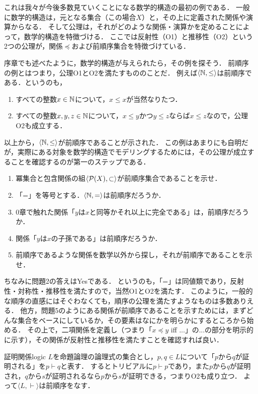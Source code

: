 \documentclass[dvipdfmx,11pt,a4paper]{jsarticle}
\begin{document}
これは我々が今後多数見ていくことになる数学的構造の最初の例である．
一般に数学的構造は，元となる集合（この場合$X$）と，その上に定義された関係や演算からなる．
そして公理は，それがどのような関係・演算かを定めることによって，数学的構造を特徴づける．
ここでは反射性（O1）と推移性（O2）という2つの公理が，関係$\preceq$および前順序集合を特徴づけている．

序章でも述べたように，数学的構造が与えられたら，その例を探そう．
前順序の例とはつまり，公理O1とO2を満たすもののことだ．
例えば$\langle \mathbb{N}, \leq \rangle$は前順序である．というのも，
\begin{enumerate}
 \item すべての整数$x \in \mathbb{N}$について，$x \leq x$が当然なりたつ．
 \item すべての整数$x, y, z \in \mathbb{N}$について，$x \leq y$かつ$y \leq z$ならば$x \leq z$なので，公理O2も成立する．
\end{enumerate}
以上から，$\langle \mathbb{N}, \leq \rangle$が前順序であることが示された．
この例はあまりにも自明だが，実際にある対象を数学的構造でモデリングするためには，その公理が成立することを確認するのが第一のステップである．

\begin{renshu}{}{}
\begin{enumerate}
 \item 冪集合と包含関係の組$\langle \mathcal{P}(X), \subset \rangle$が前順序集合であることを示せ． 
 \item 「=」を等号とする．$\langle \mathbb{N}, = \rangle$は前順序だろうか．
 \item 0章で触れた関係「$y$は$x$と同等かそれ以上に完全である」は，前順序だろうか．
 \item 関係「$y$は$x$の子孫である」は前順序だろうか．
 \item 前順序であるような関係を数学以外から探し，それが前順序であることを示せ．
\end{enumerate}
\end{renshu}

ちなみに問題2の答えはYesである．
というのも，「=」は同値類であり，反射性・対称性・推移性を満たすので，当然O1とO2を満たす．
このように，一般的な順序の直感にはそぐわなくても，順序の公理を満たすようなものは多数ありえる．
他方，問題5のようにある関係が前順序であることを示すためには，まずどんな集合をベースにしているか，その要素はなにかを明らかにするところから始める．
その上で，二項関係を定義し（つまり「$x \preceq y$ iff ...」の...の部分を明示的に示す），その関係が反射性と推移性を満たすことを確認すれば良い．

\begin{rei}{証明関係}{logic}
 $L$を命題論理の論理式の集合とし，$p, q \in L$について「$p$から$q$が証明される」を$p \vdash q$と表す．
 するとトリビアルに$p \vdash p$であり，また$p$から$q$が証明され，$q$から$s$が証明されるなら$p$から$s$が証明できる，つまりO2も成り立つ．
 よって$\langle L, \vdash \rangle$は前順序をなす．
\end{rei}
\end{document}
